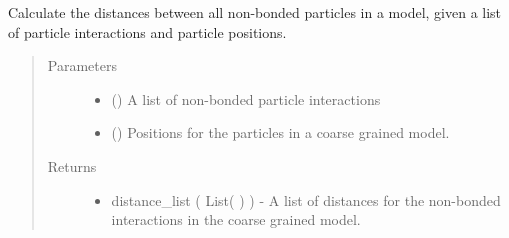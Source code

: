 \documentclass[letterpaper,12pt,english,openany,oneside]{sphinxmanual}
\begin{document}
\begin{fulllineitems}
\label{\detokenize{utilities:utilities.util.distances}}
Calculate the distances between all non-bonded particles in a model, given a list of particle interactions and particle positions.
\begin{quote}\begin{description}
\item[{Parameters}] \leavevmode\begin{itemize}
\item {} 
 (\sphinxstyleliteralemphasis{\sphinxupquote{( }}\sphinxstyleliteralemphasis{\sphinxupquote{{[} }}\sphinxstyleliteralemphasis{\sphinxupquote{, }}\sphinxstyleliteralemphasis{\sphinxupquote{ {]} }}\sphinxstyleliteralemphasis{\sphinxupquote{)}}) \textendash{} A list of non-bonded particle interactions

\item {} 
 (\sphinxstyleliteralemphasis{\sphinxupquote{( }}\sphinxstyleliteralemphasis{\sphinxupquote{ ( }}\sphinxstyleliteralemphasis{\sphinxupquote{ ) }}\sphinxstyleliteralemphasis{\sphinxupquote{)}}) \textendash{} Positions for the particles in a coarse grained model.

\end{itemize}

\item[{Returns}] \leavevmode
\begin{itemize}
\item {} 
distance\_list ( List(  ) ) - A list of distances for the non-bonded interactions in the coarse grained model.

\end{itemize}


\end{description}\end{quote}

\end{fulllineitems}
\end{document}
